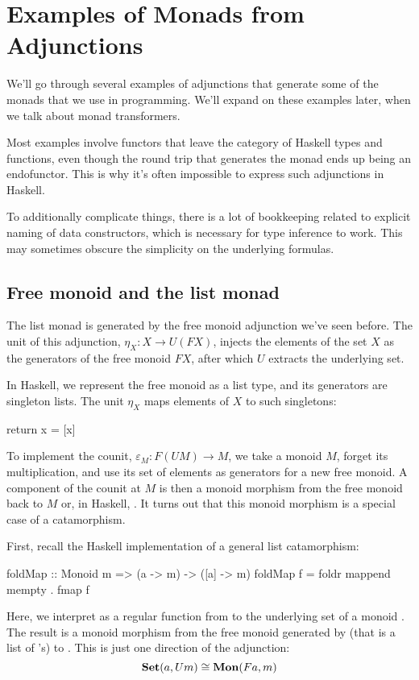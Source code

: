 \documentclass[DaoFP]{subfiles}
\begin{document}
\section{Examples of Monads from Adjunctions}

We'll go through several examples of adjunctions that generate some of the monads that we use in programming. We'll expand on these examples later, when we talk about monad transformers.

Most examples involve functors that leave the category of Haskell types and functions, even though the round trip that generates the monad ends up being an endofunctor. This is why it's often impossible to express such adjunctions in Haskell. 

To additionally complicate things, there is a lot of bookkeeping related to explicit naming of data constructors, which is necessary for type inference to work. This may sometimes obscure the simplicity on the underlying formulas.

\subsection{Free monoid and the list monad}
The list monad is generated by the free monoid adjunction we've seen before. The unit of this adjunction, $\eta_X \colon X \to U (F X)$, injects the elements of the set $X$ as the generators of the free monoid $F X$, after which $U$ extracts the underlying set. 

In Haskell, we represent the free monoid as a list type, and its generators are singleton lists. The unit $\eta_X$ maps elements of $X$ to such singletons:
\begin{haskell}
return x = [x]
\end{haskell}
To implement the counit, $\varepsilon_M \colon F (U M) \to M$, we take a monoid $M$, forget its multiplication, and use its set of elements as generators for a new free monoid. A component of the counit at $M$ is then a monoid morphism from the free monoid back to $M$ or, in Haskell, . It turns out that this monoid morphism is a special case of a catamorphism. 

First, recall the Haskell implementation of a general list catamorphism:
\begin{haskell}
foldMap :: Monoid m => (a -> m) -> ([a] -> m)
foldMap f = foldr mappend mempty . fmap f
\end{haskell}
Here, we interpret  as a regular function from  to the underlying set of a monoid . The result is a monoid morphism from the free monoid generated by  (that is a list of 's) to . This is just one direction of the adjunction:
\[ \mathbf{Set} (a, U m) \cong \mathbf{Mon} (F a, m) \]
\end{document}
